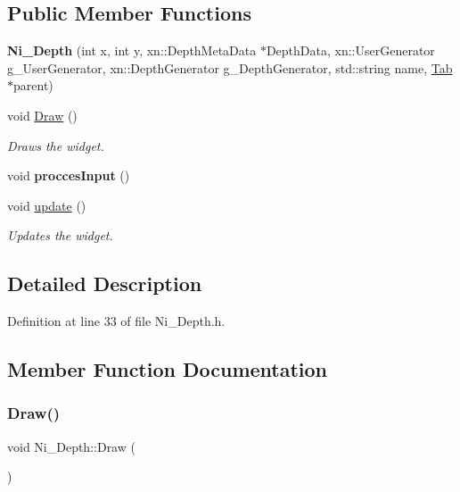 \subsection*{Public Member Functions}
\begin{DoxyCompactItemize}
\item 
\mbox{\label{class_ni___depth_a5eb2d53894b1e891c70648587c6f45e9}} 
{\bfseries Ni\+\_\+\+Depth} (int x, int y, xn\+::\+Depth\+Meta\+Data $\ast$Depth\+Data, xn\+::\+User\+Generator g\+\_\+\+User\+Generator, xn\+::\+Depth\+Generator g\+\_\+\+Depth\+Generator, std\+::string name, \hyperlink{class_tab}{Tab} $\ast$parent)
\item 
void \hyperlink{class_ni___depth_a6f6a022f4fbae3f3e157669929ec0d38}{Draw} ()
\begin{DoxyCompactList}\small\item\em Draws the widget. \end{DoxyCompactList}\item 
\mbox{\label{class_ni___depth_aa46fac0e5af19021fd82a93804748f5e}} 
void {\bfseries procces\+Input} ()
\item 
void \hyperlink{class_ni___depth_a6cf160e8edd85c236f61b5a45aa743dc}{update} ()
\begin{DoxyCompactList}\small\item\em Updates the widget. \end{DoxyCompactList}\end{DoxyCompactItemize}


\subsection{Detailed Description}


Definition at line 33 of file Ni\+\_\+\+Depth.\+h.



\subsection{Member Function Documentation}
\mbox{\label{class_ni___depth_a6f6a022f4fbae3f3e157669929ec0d38}} 
\subsubsection{\texorpdfstring{Draw()}{Draw()}}
{\footnotesize\ttfamily void Ni\+\_\+\+Depth\+::\+Draw (\begin{DoxyParamCaption}{ }\end{DoxyParamCaption})\hspace{0.3cm}{\ttfamily [virtual]}}



